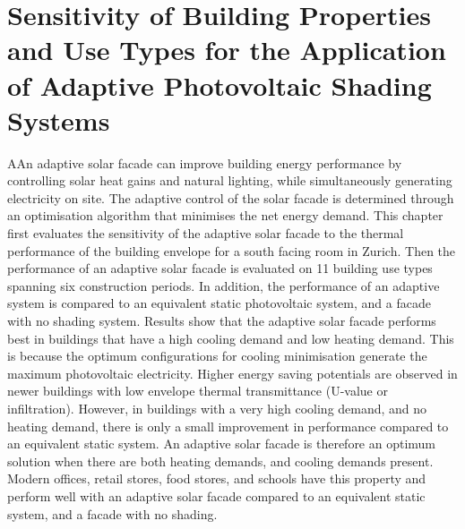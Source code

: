 
\chapter{Sensitivity of Building Properties and Use Types for the Application of Adaptive Photovoltaic Shading Systems}
\label{ch:asfArchetype}

\graphicspath{{chapters/ch3Archetype//Images/}}

\begin{chapterabstract}
AAn adaptive solar facade can improve building energy performance by controlling solar heat gains and natural lighting, while simultaneously generating electricity on site. The adaptive control of the solar facade is determined through an optimisation algorithm that minimises the net energy demand. This chapter first evaluates the sensitivity of the adaptive solar facade to the thermal performance of the building envelope for a south facing room in Zurich. Then the performance of an adaptive solar facade is evaluated on 11 building use types spanning six construction periods. In addition, the performance of an adaptive system is compared to an equivalent static photovoltaic system, and a facade with no shading system. Results show that the adaptive solar facade performs best in buildings that have a high cooling demand and low heating demand. This is because the optimum configurations for cooling minimisation generate the maximum photovoltaic electricity. Higher energy saving potentials are observed in newer buildings with low envelope thermal transmittance (U-value or infiltration). However, in buildings with a very high cooling demand, and no heating demand, there is only a small improvement in performance compared to an equivalent static system. An adaptive solar facade is therefore an optimum solution when there are both heating demands, and cooling demands present. Modern offices, retail stores, food stores, and schools have this property and perform well with an adaptive solar facade compared to an equivalent static system, and a facade with no shading.
\end{chapterabstract}


\newpage

